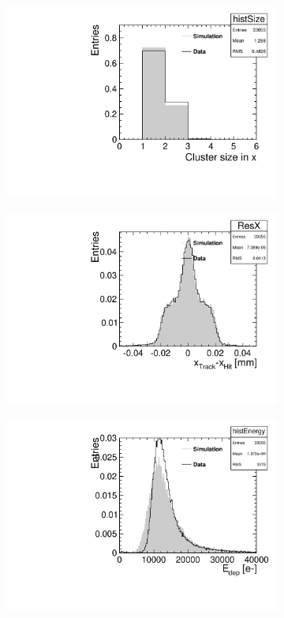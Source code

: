 \begin{figure}[htbp] \centering
  \begin{subfigure}[b]{0.3\textwidth}
    \includegraphics[width=\textwidth]{figures/TestBeam/150micron_sizeX.pdf}
    \caption{}
  \end{subfigure} \hfill
  \begin{subfigure}[b]{0.3\textwidth}
    \includegraphics[width=\textwidth]{figures/TestBeam/150micron_resX.pdf}
    \caption{}
  \end{subfigure} \hfill
  \begin{subfigure}[b]{0.3\textwidth}
    \includegraphics[width=\textwidth]{figures/TestBeam/150micron_Edep.pdf}

\end{subfigure}
\end{figure}
